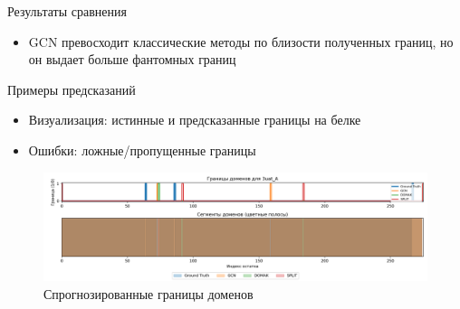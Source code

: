 \documentclass{beamer}
\begin{document}
\begin{frame}{Результаты сравнения}

    \begin{table}[h!]
    \centering
    \caption{Сравнение качества методов выделения доменных границ}
    \end{table}

  \begin{itemize}
    \item GCN превосходит классические методы по близости полученных границ, но он выдает больше фантомных границ
  \end{itemize}
\end{frame}

\begin{frame}{Примеры предсказаний}
  \begin{itemize}
    \item Визуализация: истинные и предсказанные границы на белке
    \item Ошибки: ложные/пропущенные границы
  \end{itemize}
  \begin{figure}
      \centering
      \includegraphics[width=0.8\linewidth]{example_pred.png}
      \caption{Спрогнозированные границы доменов}
      \label{fig:enter-label}
  \end{figure}
  
\end{frame}
\end{document}

